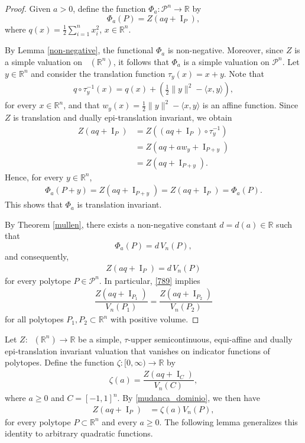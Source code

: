 \documentclass[11pt]{article}
\theoremstyle{definition} %
\newcommand{\RR}{(\mathbb{R}^n)}
\DeclareMathOperator{\I}{I}
\DeclareMathOperator{\LP}{Conv_{lp}}
\begin{document}
\begin{proof}
Given $a>0$, define  the function $\Phi_a: \mathcal{P}^n\to \mathbb{R}$  by
$$\Phi_a(P)=Z(aq+\I_P),$$
where  $q(x)=\frac{1}{2}\sum_{i=1}^nx_i^2$, $x\in\mathbb{R}^n$.

By  Lemma \ref{non-negative}, the functional $\Phi_a$ is  non-negative. Moreover, since $Z$ is a simple valuation on $\LP\RR$, it follows that $\Phi_a$ is a simple valuation on $\mathcal{P}^n$. Let $y\in\mathbb{R}^n$ and consider the translation function $\tau_y(x)=x+y$. Note that
\begin{align*}
    q\circ\tau_y^{-1}(x)= q(x)+ \left(\tfrac{1}{2}\|y\|^2-\langle x,y\rangle\right),
\end{align*}
 for every $x\in\mathbb{R}^n$, and that $w_y(x)= \tfrac{1}{2}\|y\|^2-\langle x,y\rangle$ is an affine function. Since $Z$ is translation and  dually epi-translation invariant, we obtain
\begin{align*}
    Z(aq + \I_P)
      &= Z((aq + \I_P) \circ \tau_y^{-1}) \\
      &= Z(aq + aw_y + \I_{P+y}) \\
      &= Z(aq + \I_{P+y}).
\end{align*}
Hence, for every  $y\in\mathbb{R}^n$,
\begin{align*}
\Phi_a(P+y)  = Z(aq+\I_{P+y})=   Z(aq+\I_P)= \Phi_a(P). 
\end{align*}
This shows that $\Phi_a$ is translation invariant.

By Theorem \ref{mullen},  there exists a non-negative constant $d=d(a)\in\mathbb{R}$ such that 
$$\Phi_a(P)= d\,V_n(P),$$
and consequently,
\begin{align}\label{789}
 Z(aq+ \I_P)= d\,V_n(P)   
\end{align}
for every polytope $P\in\mathcal{P}^n$. In particular, \eqref{789} implies
\begin{align*}
 \dfrac{Z(aq+\I_{P_1})}{V_n(P_1)}= \dfrac{Z(aq+\I_{P_2})}{V_n(P_2)}   
\end{align*}
for all polytopes $P_1,P_2\subset\mathbb{R}^n$ with positive volume.
\end{proof}





Let $Z:\LP\RR\to\mathbb{R}$ be a simple, $\tau$-upper semicontinuous, equi-affine and dually epi-translation invariant valuation that vanishes on indicator functions of polytopes. Define the function $\zeta:[0,\infty)\rightarrow \mathbb{R}$ by
\begin{align}\label{zeta}
    \zeta (a)= \dfrac{Z(aq+\I_{C})}{V_n(C)}, 
\end{align}
where $a\geq 0$ and  $C=[-1,1]^n$. By \eqref{mudanca_dominio}, we then have
\begin{align*}
   Z(aq+\I_P) &=  \zeta(a)V_n(P),
\end{align*}
for every polytope $P\subset\mathbb{R}^n$ and every $a\geq 0$.  The following lemma generalizes this identity to arbitrary quadratic functions.
\end{document}
